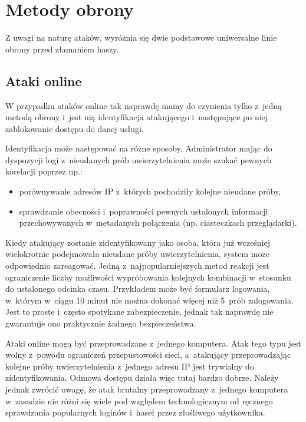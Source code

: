 \section{Metody obrony}

Z uwagi na naturę ataków, wyróżnia się dwie podstawowe uniwersalne linie obrony
przed złamaniem haszy.

\subsection{Ataki online}

W przypadku ataków online tak naprawdę mamy do czynienia tylko z~jedną metodą
obrony i~jest nią identyfikacja atakującego i~następujące po niej zablokowanie
dostępu do danej usługi.

Identyfikacja może następować na różne sposoby. Administrator mając do
dyspozycji logi z~nieudanych prób uwierzytelnienia może szukać pewnych
korelacji poprzez np.:

\begin{itemize}

\item porównywanie adresów IP z~których pochodziły kolejne nieudane próby,

\item sprawdzanie obecności i~poprawności pewnych ustalonych informacji
przechowywanych w~metadanych połączenia (np. ciasteczkach przeglądarki).

\end{itemize}

Kiedy atakujący zostanie zidentyfikowany jako osoba, która już wcześniej
wielokrotnie podejmowała nieudane próby uwierzytelnienia, system może
odpowiednio zareagować. Jedną z~najpopularniejszych metod reakcji jest
ograniczenie liczby możliwości wypróbowania kolejnych kombinacji w~stosunku do
ustalonego odcinka czasu. Przykładem może być formularz logowania, w~którym
w~ciągu 10 minut nie można dokonać więcej niż 5~prób zalogowania. Jest to
proste i~często spotykane zabezpieczenie, jednak tak naprawdę nie gwarantuje
ono praktycznie żadnego bezpieczeństwa.

Ataki online mogą być przeprowadzane z~jednego komputera. Atak tego typu jest
wolny z~powodu ograniczeń przepustowości sieci, a~atakujący przeprowadzając
kolejne próby uwierzytelnienia z~jednego adresu IP jest trywialny do
zidentyfikowania. Odmowa dostępu działa więc tutaj bardzo dobrze. Należy jednak
zwrócić uwagę, że atak brutalny przeprowadzany z~jednego komputera w~zasadzie
nie różni się wiele pod względem technologicznym od ręcznego sprawdzania
popularnych loginów i~haseł przez złośliwego użytkownika.

